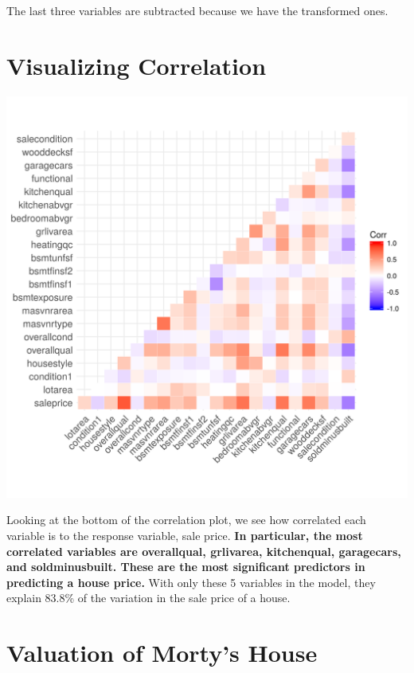 \documentclass[12pt]{article}
\begin{document}
\begin{flushleft}
\begin{flushleft}
\begin{flushleft}
The last three variables are subtracted because we have the transformed ones.
\end{flushleft}
\section{Visualizing Correlation}

\centering
    \vspace*{0.5 cm}
    \includegraphics[scale = 1]{plot4.png}\\[1.0 cm]	
\begin{flushleft}

Looking at the bottom of the correlation plot, we see how correlated each variable is to the response variable, sale price. \textbf{In particular, the most correlated variables are overallqual, grlivarea,
kitchenqual, garagecars, and soldminusbuilt. These are the most significant predictors in predicting a house price.} With only these 5 variables in the model, they explain 83.8\% of the variation in the sale price of a house.
\end{flushleft}

\section{Valuation of Morty's House}


\end{flushleft}
\end{flushleft}
\end{document}
